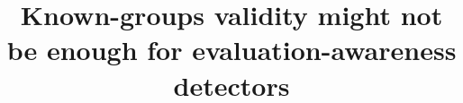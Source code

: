 \documentclass[11pt,a4paper]{article}
\title[Known-groups validity might not be enough]{Known-groups validity might not be enough for evaluation-awareness detectors}
\begin{document}
\maketitle








\label{endofmain}

\label{endofbackmatter}



\appendix

\end{document}
